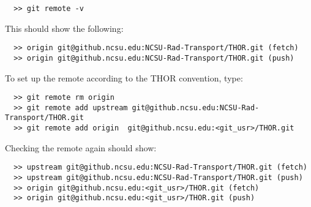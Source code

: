 \begin{verbatim}
  >> git remote -v
\end{verbatim}
This should show the following:
\begin{verbatim}
  >> origin	git@github.ncsu.edu:NCSU-Rad-Transport/THOR.git (fetch) 
  >> origin	git@github.ncsu.edu:NCSU-Rad-Transport/THOR.git (push)
\end{verbatim}
To set up the remote according to the THOR convention, type:
\begin{verbatim}
  >> git remote rm origin
  >> git remote add upstream git@github.ncsu.edu:NCSU-Rad-Transport/THOR.git
  >> git remote add origin 	git@github.ncsu.edu:<git_usr>/THOR.git
\end{verbatim}
Checking the remote again should show:
\begin{verbatim}
  >> upstream git@github.ncsu.edu:NCSU-Rad-Transport/THOR.git (fetch) 
  >> upstream git@github.ncsu.edu:NCSU-Rad-Transport/THOR.git (push)
  >> origin	git@github.ncsu.edu:<git_usr>/THOR.git (fetch) 
  >> origin	git@github.ncsu.edu:<git_usr>/THOR.git (push)
\end{verbatim}

